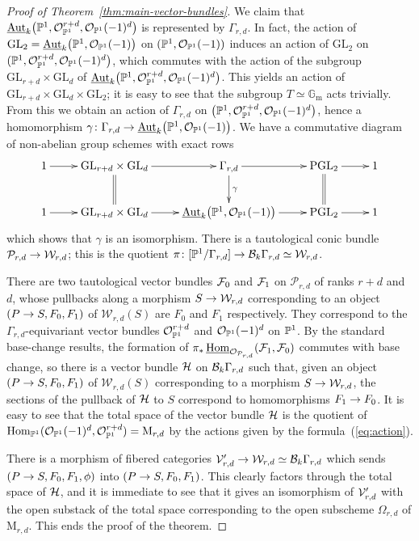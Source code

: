 \documentclass{amsart}
\numberwithin{equation}{section}
\numberwithin{subsection}{section}
\theoremstyle{definition}
\theoremstyle{remark}
\newcommand\cO{\mathcal{O}} \newcommand\cP{\mathcal{P}}
\newcommand\cW{\mathcal{W}} \newcommand\cX{\mathcal{X}}
\newcommand\rM{\mathrm{M}} \newcommand\rN{\mathrm{N}}
\newcommand\arr{\ifinner\to\else\longrightarrow\fi}
\renewcommand\hom{\operatorname{Hom}}
\newcommand{\underhom}
{\mathop{\underline{\mathrm{Hom}}}\nolimits}
\newcommand{\underaut}
{\mathop{\underline{\mathrm{Aut}}}\nolimits}
\newcommand{\vectalt}[1][r,d]{\cV'_{#1}}
\newcommand{\vectaux}[1][r,d]{\cW_{#1}}
\newcommand{\om}[1][r,d]{\Omega_{#1}}
\newcommand{\mm}[1][r,d]{\rM_{#1}}
\newcommand{\grp}[1][r,d]{\Gamma_{#1}}
\newcommand{\GL}{\mathrm{GL}}
\newcommand{\PGL}{\mathrm{PGL}}
\newcommand{\gm}{\mathbb{G}_{\mathrm{m}}}
\begin{document}
\begin{proof}[Proof of Theorem~\ref{thm:main-vector-bundles}]
We claim that $\underaut_{k}\bigl(\PP^{1}, \cO_{\PP^{1}}^{r+d}, \cO_{\PP^{1}}(-1)^{d}\bigr)$ is represented by $\grp$. In fact, the action of $\GL_{2} = \underaut_{k}\bigl(\PP^{1}, \cO_{\PP^{1}}(-1)\bigr)$ on $(\PP^{1}, \cO_{\PP^{1}}(-1))$ induces an action of $\GL_{2}$ on $(\PP^{1}, \cO_{\PP^{1}}^{r+d}, \cO_{\PP^{1}}(-1)^{d}\bigr)$, which commutes with the action of the subgroup $\GL_{r+d} \times \GL_{d}$ of $\underaut_{k}\bigl(\PP^{1}, \cO_{\PP^{1}}^{r+d}, \cO_{\PP^{1}}(-1)^{d}\bigr)$. This yields an action of $\GL_{r+d} \times \GL_{d} \times \GL_{2}$; it is easy to see that the subgroup $T \simeq \gm$ acts trivially. From this we obtain an action of $\Gamma_{r,d}$ on $\bigl(\PP^{1}, \cO_{\PP^{1}}^{r+d}, \cO_{\PP^{1}}(-1)^{d}\bigr)$, hence a homomorphism $\gamma\colon \Gamma_{r,d} \arr \underaut_{k}\bigl(\PP^{1}, \cO_{\PP^{1}}(-1)\bigr)$. We have a commutative diagram of non-abelian group schemes with exact rows
   \[
   \xymatrix{1 \ar[r]&
   \GL_{r+d} \times \GL_{d}\ar[r]\ar@{ = }[d]&
   \Gamma_{r,d} \ar[r]\ar[d]^{\gamma}&
   \PGL_{2}\ar[r]\ar@{ = }[d]& 1\\
   1 \ar[r]&
   \GL_{r+d} \times \GL_{d}\ar[r]&
   \underaut_{k}\bigl(\PP^{1}, \cO_{\PP^{1}}(-1)\bigr) \ar[r]&
   \PGL_{2}\ar[r]
   & 1
   }
   \]
which shows that $\gamma$ is an isomorphism. There is a tautological conic bundle $\cP_{r,d} \arr \vectaux$; this is the quotient $\pi\colon [\PP^{1}/\Gamma_{r,d}] \arr \cB_{k}\Gamma_{r,d} \simeq \vectaux$.

There are two tautological vector bundles $\mathcal{F}_{0}$ and $\mathcal{F}_{1}$ on $\cP_{r,d}$ of ranks $r+d$ and $d$, whose pullbacks along a morphism $S \arr \vectaux$ corresponding to an object $(P \arr S, F_{0}, F_{1})$ of $\vectaux(S)$ are $F_{0}$ and $F_{1}$ respectively. They correspond to the $\Gamma_{r,d}$-equivariant vector bundles $\cO_{\PP^{1}}^{r+d}$ and $\cO_{\PP^{1}}(-1)^{d}$ on $\mathbb{P}^{1}$. By the standard base-change results, the formation of $\pi_{*}\underhom_{\cO_{\cP_{r,d}}}(\cF_{1}, \cF_{0})$ commutes with base change, so there is a vector bundle $\mathcal{H}$ on $\mathcal{B}_{k}\Gamma_{r,d}$ such that, given an object $(P \arr S, F_{0}, F_{1})$ of $\vectaux(S)$ corresponding to a morphism $S \arr \vectaux$, the sections of the pullback of $\mathcal{H}$ to $S$ correspond to homomorphisms $F_{1} \arr F_{0}$. It is easy to see that the total space of the vector bundle $\mathcal{H}$ is the quotient of $\hom_{\PP^{1}}(\cO_{\PP^{1}}(-1)^{d}, \cO_{\PP^{1}}^{r+d}) = \mm$ by the actions given by the formula~(\ref{eq:action}).

There is a morphism of fibered categories $\vectalt \arr \vectaux \simeq \cB_{k}\Gamma_{r,d}$ which sends $(P \arr S, F_{0}, F_{1}, \phi)$ into $(P \arr S, F_{0}, F_{1})$. This clearly factors through the total space of $\mathcal{H}$, and it is immediate to see that it gives an isomorphism of $\vectalt$ with the open substack of the total space corresponding to the open subscheme $\om$ of $\mm$. This ends the proof of the theorem.
\end{proof}
\end{document}
